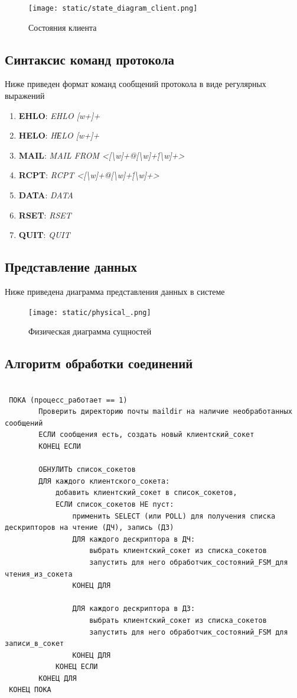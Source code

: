 \documentclass[a4paper,12pt]{report}
\begin{document}
\begin{figure}
	\centering
	\texttt{[image: static/state\_diagram\_client.png]}
	\caption{Состояния клиента}
	\label{fig:lient_fsm}
\end{figure}

\subsection{Синтаксис команд протокола}
Ниже приведен формат команд сообщений протокола в виде регулярных выражений
\begin{enumerate}
\item \textbf{EHLO}: {\it EHLO [w+]+\/}
\item \textbf{HELO}: {\it HЕLO [w+]+\/}
\item \textbf{MAIL}: {\it MAIL FROM <[\textbackslash w]+@[\textbackslash w]+\.[\textbackslash w]+>\/}
\item \textbf{RCPT}: {\it RCPT <[\textbackslash w]+@[\textbackslash w]+\.[\textbackslash w]+>\/}
\item \textbf{DATA}: {\it DATA\/}
\item \textbf{RSET}: {\it RSET\/}
\item \textbf{QUIT}: {\it QUIT\/}
\end{enumerate}

\subsection*{Представление данных}
Ниже приведена диаграмма представления данных в системе
\begin{figure}
\centering
\texttt{[image: static/physical\_.png]}
\caption{Физическая диаграмма сущностей}
\label{fig:phys_diagram}
\end{figure}


\subsection{Алгоритм обработки соединений}
\begin{verbatim}

 ПОКА (процесс_работает == 1)
        Проверить директорию почты maildir на наличие необработанных сообщений
        ЕСЛИ сообщения есть, создать новый клиентский_сокет
        КОНЕЦ ЕСЛИ

        ОБНУЛИТЬ список_сокетов
        ДЛЯ каждого клиентского_сокета:
            добавить клиентский_сокет в список_сокетов,
            ЕСЛИ список_сокетов НЕ пуст:
                применить SELECT (или POLL) для получения списка дескрипторов на чтение (ДЧ), запись (ДЗ)
                ДЛЯ каждого дескриптора в ДЧ:
                    выбрать клиентский_сокет из списка_сокетов
                    запустить для него обработчик_состояний_FSM_для чтения_из_сокета
                КОНЕЦ ДЛЯ

                ДЛЯ каждого дескриптора в ДЗ:
                    выбрать клиентский_сокет из списка_сокетов
                    запустить для него обработчик_состояний_FSM для записи_в_сокет
                КОНЕЦ ДЛЯ
            КОНЕЦ ЕСЛИ
        КОНЕЦ ДЛЯ
 КОНЕЦ ПОКА

\end{verbatim}
\end{document}

